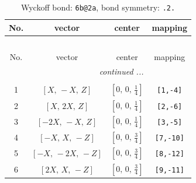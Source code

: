 \documentclass[fleqn,8pt]{jsarticle}
\begin{document}
\begin{longtable}{cccc}
\caption{Wyckoff bond: {\tt 6b@2a}, bond symmetry: {\tt .2.}}
 \\
 \hline \hline
No. & vector & center & mapping \\ \hline \endfirsthead

\multicolumn{3}{l}{\tablename\ \thetable{}} \\
 \hline \hline
No. & vector & center & mapping \\ \hline \endhead

 \hline \hline
\multicolumn{3}{r}{\footnotesize\it continued ...} \\ \endfoot

 \hline \hline
\multicolumn{3}{r}{} \\ \endlastfoot

1 & $\left[ X,\, - X,\, Z \right]$ & $\left[ 0,\, 0,\, \frac{1}{4} \right]$ & {\tt [1,-4]} \\ \hline
2 & $\left[ X,\, 2 X,\, Z \right]$ & $\left[ 0,\, 0,\, \frac{1}{4} \right]$ & {\tt [2,-6]} \\ \hline
3 & $\left[ - 2 X,\, - X,\, Z \right]$ & $\left[ 0,\, 0,\, \frac{1}{4} \right]$ & {\tt [3,-5]} \\ \hline
4 & $\left[ - X,\, X,\, - Z \right]$ & $\left[ 0,\, 0,\, \frac{3}{4} \right]$ & {\tt [7,-10]} \\ \hline
5 & $\left[ - X,\, - 2 X,\, - Z \right]$ & $\left[ 0,\, 0,\, \frac{3}{4} \right]$ & {\tt [8,-12]} \\ \hline
6 & $\left[ 2 X,\, X,\, - Z \right]$ & $\left[ 0,\, 0,\, \frac{3}{4} \right]$ & {\tt [9,-11]} \\
\end{longtable}
\renewcommand{\arraystretch}{1.2}
\end{document}
